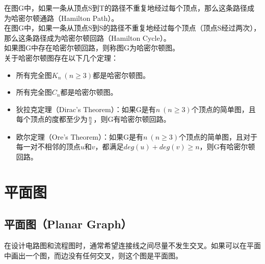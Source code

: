 在图G中，如果一条从顶点S到T的路径不重复地经过每个顶点，那么这条路径成为哈密尔顿通路（Hamilton Path）。\\

在图G中，如果一条从顶点S到S的路径不重复地经过每个顶点（顶点S经过两次），那么这条路径成为哈密尔顿回路（Hamilton Cycle）。\\

如果图G中存在哈密尔顿回路，则称图G为哈密尔顿图。\\

关于哈密尔顿图存在以下几个定理：

\begin{itemize}
	\item 所有完全图$ K_n\ (n \ge 3) $都是哈密尔顿图。

	\item 所有完全图$ C_n $都是哈密尔顿图。

	\item 狄拉克定理（Dirac's Theorem）：如果G是有$ n\ (n \ge 3) $个顶点的简单图，且每个顶点的度都至少为$ n \over 2 $，则G有哈密尔顿回路。

	\item 欧尔定理（Ore's Theorem）：如果G是有$ n\ (n \ge 3) $个顶点的简单图，且对于每一对不相邻的顶点$ u $和$ v $，都满足$ deg(u) + deg(v) \ge n $，则G有哈密尔顿回路。
\end{itemize}

\newpage

\section{平面图}

\subsection{平面图（Planar Graph）}

在设计电路图和流程图时，通常希望连接线之间尽量不发生交叉。如果可以在平面中画出一个图，而边没有任何交叉，则这个图是平面图。

